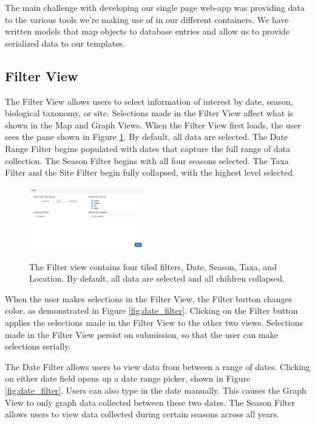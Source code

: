 \documentclass[10pt,peerreview,onecolumn,draftclsnofoot,technote]{IEEEtran}
\begin{document}
The main challenge with developing our single page web-app was providing data to the various tools we’re making use of in our different containers.
We have written models that map objects to database entries and allow us to provide serialized data to our templates.

\subsection{Filter View}

The Filter View allows users to select information of interest by date, season, biological taxonomy, or site.
Selections made in the Filter View affect what is shown in the Map and Graph Views.
When the Filter View first loads, the user sees the pane shown in Figure \ref{fig:overall_filter}.
By default, all data are selected.
The Date Range Filter begins populated with dates that capture the full range of data collection. 
The Season Filter begins with all four seasons selected.
The Taxa Filter and the Site Filter begin fully collapsed, with the highest level selected.

\begin{figure}[h]
\caption{
  The Filter view contains four tiled filters, Date, Season, Taxa, and Location.
  By default, all data are selected and all children collapsed.
}
\centering
\includegraphics[width=0.45\textwidth]{images/overall_filter.png}
\label{fig:overall_filter}
\end{figure}

When the user makes selections in the Filter View, the Filter button changes color, as demonstrated in Figure \ref{fig:date_filter}.
Clicking on the Filter button applies the selections made in the Filter View to the other two views.
Selections made in the Filter View persist on submission, so that the user can make selections serially.

The Date Filter allows users to view data from between a range of dates.
Clicking on either date field opens up a date range picker, shown in Figure \ref{fig:date_filter}.
Users can also type in the date manually.
This causes the Graph View to only graph data collected between these two dates.
The Season Filter allows users to view data collected during certain seasons across all years.
\end{document}
